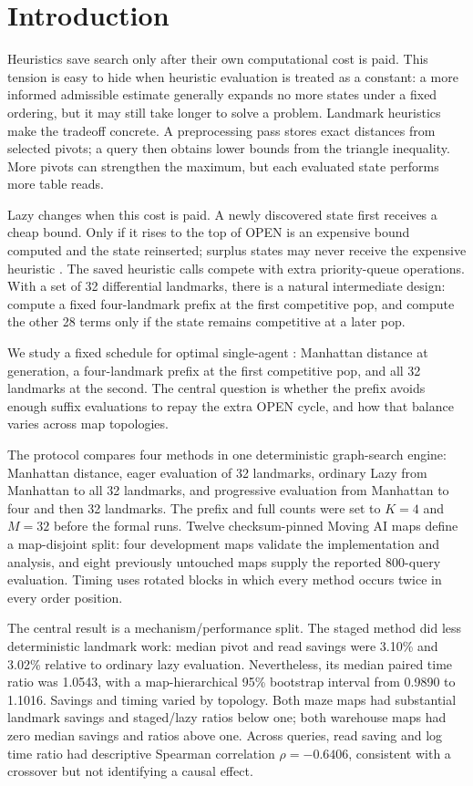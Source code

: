 \section{Introduction}
\label{sec:introduction}

Heuristics save search only after their own computational cost is paid.  This
tension is easy to hide when heuristic evaluation is treated as a constant:
a more informed admissible estimate generally expands no more states under a
fixed ordering, but it may still take longer to solve a problem.  Landmark
heuristics make the tradeoff concrete.  A preprocessing pass stores exact
distances from selected pivots; a query then obtains lower bounds from the
triangle inequality.  More pivots can strengthen the maximum, but each
evaluated state performs more table reads.

Lazy \Astar{} changes when this cost is paid.  A newly discovered state first
receives a cheap bound.  Only if it rises to the top of OPEN is an expensive
bound computed and the state reinserted; surplus states may never receive the
expensive heuristic \citep{tolpin2013towards,karpas2018rational}.  The saved
heuristic calls compete with extra priority-queue operations.  With a set of
32 differential landmarks, there is a natural intermediate design: compute a
fixed four-landmark prefix at the first competitive pop, and compute the other
28 terms only if the state remains competitive at a later pop.

We study a fixed schedule for optimal single-agent \Astar{}: Manhattan distance
at generation, a four-landmark prefix at the first competitive pop, and all 32
landmarks at the second.  The central question is whether the prefix avoids
enough suffix evaluations to repay the extra OPEN cycle, and how that balance
varies across map topologies.

The protocol compares four methods in one deterministic graph-search engine:
Manhattan distance,
eager evaluation of 32 landmarks, ordinary Lazy \Astar{} from Manhattan to all
32 landmarks, and progressive evaluation from Manhattan to four and then 32
landmarks.  The prefix and full counts were set to $K=4$ and $M=32$ before the
formal runs.  Twelve checksum-pinned Moving AI maps define a map-disjoint
split: four development maps validate the implementation and analysis, and
eight previously untouched maps supply the reported 800-query evaluation.
Timing uses rotated blocks in which every method occurs twice in every order
position.

The central result is a mechanism/performance split.  The staged method did
less deterministic landmark work: median pivot and read savings were 3.10\%
and 3.02\% relative to ordinary lazy evaluation.  Nevertheless, its median
paired time ratio was 1.0543, with a map-hierarchical 95\% bootstrap interval
from 0.9890 to 1.1016.  Savings and timing varied by topology.  Both maze maps
had substantial landmark savings and staged/lazy ratios below one; both
warehouse maps had zero median savings and ratios above one.  Across queries,
read saving and log time ratio had descriptive Spearman correlation
$\rho=-0.6406$, consistent with a crossover but not identifying a causal
effect.

